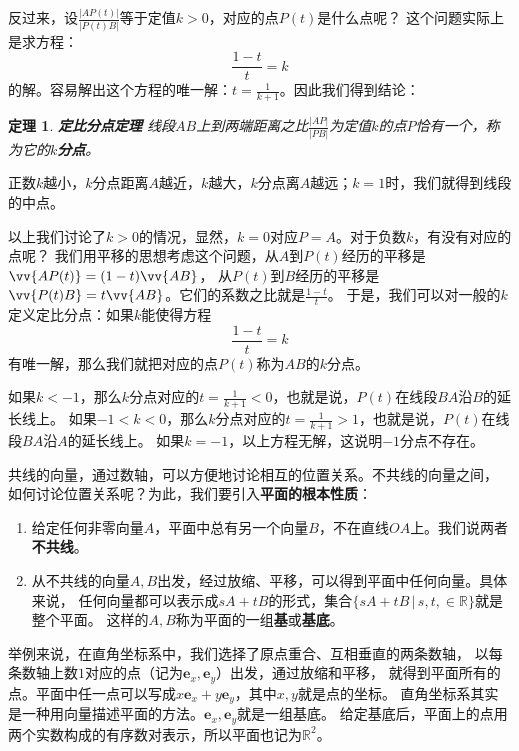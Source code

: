 \documentclass[12pt,UTF8]{ctexbook}
\newtheorem{tm}{定理}[section]
\begin{document}
反过来，设$ \frac{|AP(t)|}{|P(t)B|}$等于定值$k > 0$，对应的点$P(t)$是什么点呢？
这个问题实际上是求方程：
$$ \frac{1 - t}{t} = k$$
的解。容易解出这个方程的唯一解：$t = \frac{1}{k+1}$。因此我们得到结论：
\begin{tm}{\textbf{定比分点定理} }\label{tm:0-0-10}
    线段$AB$上到两端距离之比$\frac{|AP|}{|PB|}$为定值$k$的点$P$恰有一个，称为它的$k$\textbf{分点}。
\end{tm}
正数$k$越小，$k$分点距离$A$越近，$k$越大，$k$分点离$A$越远；$k=1$时，我们就得到线段的中点。

以上我们讨论了$k>0$的情况，显然，$k=0$对应$P = A$。对于负数$k$，有没有对应的点呢？
我们用平移的思想考虑这个问题，从$A$到$P(t)$经历的平移是$\vv{AP(t)} = (1 - t)\vv{AB}$，
从$P(t)$到$B$经历的平移是$\vv{P(t)B} = t\vv{AB}$。它们的系数之比就是$ \frac{1 - t}{t}$。
于是，我们可以对一般的$k$定义定比分点：如果$k$能使得方程
$$ \frac{1 - t}{t} = k$$
有唯一解，那么我们就把对应的点$P(t)$称为$AB$的$k$分点。

如果$k<-1$，那么$k$分点对应的$t = \frac{1}{k+1} < 0$，也就是说，$P(t)$在线段$BA$沿$B$的延长线上。
如果$-1<k<0$，那么$k$分点对应的$t = \frac{1}{k+1} > 1$，也就是说，$P(t)$在线段$BA$沿$A$的延长线上。
如果$k=-1$，以上方程无解，这说明$-1$分点不存在。

共线的向量，通过数轴，可以方便地讨论相互的位置关系。不共线的向量之间，
如何讨论位置关系呢？为此，我们要引入\textbf{平面的根本性质}：
\begin{enumerate}
    \item 给定任何非零向量$A$，平面中总有另一个向量$B$，不在直线$OA$上。我们说两者\textbf{不共线}。
    \item 从不共线的向量$A, B$出发，经过放缩、平移，可以得到平面中任何向量。具体来说，
    任何向量都可以表示成$sA + tB$的形式，集合$\{sA + tB \,|\, s, t, \in\mathbb{R}\}$就是整个平面。
    这样的$A, B$称为平面的一组\textbf{基}或\textbf{基底}。
\end{enumerate}

举例来说，在直角坐标系中，我们选择了原点重合、互相垂直的两条数轴，
以每条数轴上数$1$对应的点（记为$\mathbf{e}_x, \mathbf{e}_y$）出发，通过放缩和平移，
就得到平面所有的点。平面中任一点可以写成$x\mathbf{e}_x + y\mathbf{e}_y$，其中$x,y$就是点的坐标。
直角坐标系其实是一种用向量描述平面的方法。$\mathbf{e}_x, \mathbf{e}_y$就是一组基底。
给定基底后，平面上的点用两个实数构成的有序数对表示，所以平面也记为$\mathbb{R}^2$。
\end{document}
